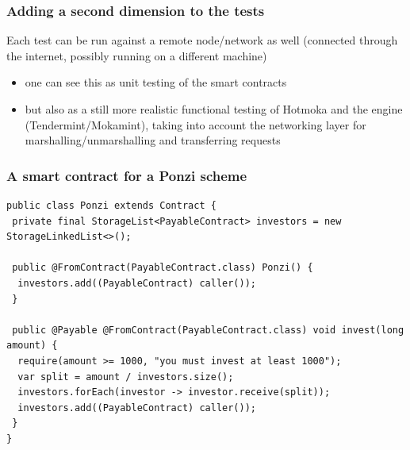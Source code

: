 \documentclass[11pt]{beamer}  %
\begin{document}
\begin{frame}\frametitle{Adding a second dimension to the tests}

  \begin{center}
    Each test can be run against a remote node/network as well
    (connected through the internet, possibly running on a different machine)
  \end{center}

  \begin{center}
  \end{center}

  \begin{itemize}
  \item one can see this as unit testing of the smart contracts
  \item but also as a still more realistic functional testing of Hotmoka and
    the engine (Tendermint/Mokamint), taking into account
    the networking layer for marshalling/unmarshalling and transferring requests
  \end{itemize}

\end{frame}

\begin{frame}[fragile]\frametitle{A smart contract for a Ponzi scheme}

  \begin{lstlisting}[language=Takamaka]
public class Ponzi extends Contract {
 private final StorageList<PayableContract> investors = new StorageLinkedList<>();

 public @FromContract(PayableContract.class) Ponzi() {
  investors.add((PayableContract) caller());
 }

 public @Payable @FromContract(PayableContract.class) void invest(long amount) {
  require(amount >= 1000, "you must invest at least 1000");
  var split = amount / investors.size();
  investors.forEach(investor -> investor.receive(split));
  investors.add((PayableContract) caller());
 }
}
  \end{lstlisting}

\end{frame}
\end{document}
